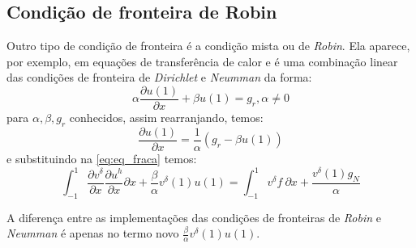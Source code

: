 \subsection{Condição de fronteira de Robin}
 Outro tipo de condição de fronteira é a condição mista ou de \emph{Robin}. Ela  aparece, por exemplo, em equações de transferência de calor e é uma combinação linear das condições de fronteira de \emph{Dirichlet} e \emph{Neumman} da forma:
 \begin{equation}
 \alpha \frac{\partial u(1)}{\partial x} + \beta u(1) = g_r , \alpha \neq 0 
 \end{equation}
 para $\alpha,\beta,g_r$ conhecidos, assim rearranjando, temos:
 \begin{equation}
 \frac{\partial u(1)}{\partial x}  =\frac{1}{\alpha}(g_r - \beta u(1))
 \end{equation}
e substituindo na \ref{eq:eq_fraca} temos:
\begin{equation}
\int^{1}_{-1} \frac{\partial v^\delta}{\partial x}  \frac{\partial u^h}{\partial x}  \partial x + \frac{\beta}{\alpha}v^\delta(1)u(1) =   \int^{1}_{-1}  v^\delta f\ \partial x + \frac{v^\delta(1)g_N}{\alpha}
\end{equation}

 A diferença entre as implementações das condições de fronteiras de \emph{Robin} e \emph{Neumman} é apenas no termo novo $\frac{\beta}{\alpha}v^\delta(1)u(1)$.
